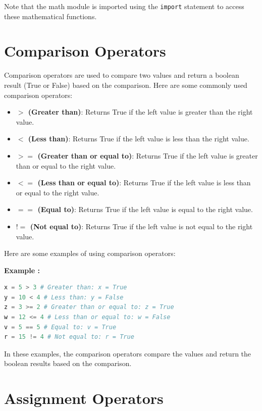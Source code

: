 \documentclass[12pt]{book}
\newtheorem{Example}{Example}[chapter]
\renewenvironment{Example}{\begin{trivlist}\item\relax
\textbf{Example \thesection: }}{\end{trivlist}}
\begin{document}
Note that the math module is imported using the \texttt{import} statement to access these mathematical functions.

\section{Comparison Operators}

Comparison operators are used to compare two values and return a boolean result (True or False) based on the comparison. Here are some commonly used comparison operators:

\begin{itemize}
\item \textbf{$>$ (Greater than)}: Returns True if the left value is greater than the right value.
\item \textbf{$<$ (Less than)}: Returns True if the left value is less than the right value.
\item \textbf{$>=$ (Greater than or equal to)}: Returns True if the left value is greater than or equal to the right value.
\item \textbf{$<=$ (Less than or equal to)}: Returns True if the left value is less than or equal to the right value.
\item \textbf{$==$ (Equal to)}: Returns True if the left value is equal to the right value.
\item \textbf{$!=$ (Not equal to)}: Returns True if the left value is not equal to the right value.
\end{itemize}

Here are some examples of using comparison operators:

\begin{Example}
\begin{lstlisting}[language=Python]
x = 5 > 3 # Greater than: x = True
y = 10 < 4 # Less than: y = False
z = 3 >= 2 # Greater than or equal to: z = True
w = 12 <= 4 # Less than or equal to: w = False
v = 5 == 5 # Equal to: v = True
r = 15 != 4 # Not equal to: r = True
\end{lstlisting}
\end{Example}

In these examples, the comparison operators compare the values and return the boolean results based on the comparison.

\section{Assignment Operators}
\end{document}

